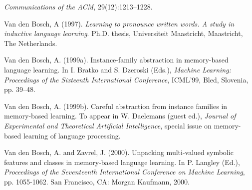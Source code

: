 \documentclass[11pt]{article}
\begin{document}
\begin{description}
    {\em Communications of the ACM}, 29(12):1213--1228.
\item
  Van den Bosch, A (1997). {\em Learning to pronounce written words.
    A study in inductive language learning}. Ph.D. thesis, 
    Universiteit Maastricht, Maastricht, The Netherlands.
\item
  Van den Bosch, A. (1999a). Instance-family abstraction in memory-based
    language learning. In I. Bratko and S. Dzeroski (Eds.), {\em Machine
    Learning: Proceedings of the Sixteenth International Conference},
    ICML'99, Bled, Slovenia, pp. 39--48.
\item
  Van den Bosch, A. (1999b). Careful abstraction from instance
    families in memory-based learning. To appear in W. Daelemans
    (guest ed.), {\em Journal of Experimental and Theoretical
    Artificial Intelligence}, special issue on memory-based learning
    of language processing.
\item
  Van den Bosch, A. and Zavrel, J. (2000). Unpacking multi-valued 
    symbolic features and classes in memory-based language learning.
    In P. Langley (Ed.), {\em Proceedings of the Seventeenth International
    Conference on Machine Learning}, pp. 1055-1062. San Francisco, 
    CA: Morgan Kaufmann, 2000.
\end{description}
\end{document}
